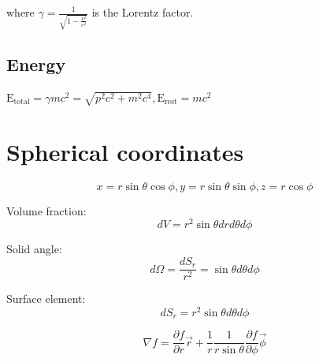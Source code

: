 \documentclass[12pt,a4paper]{article}
\begin{document}
	where \( \gamma = \frac{1}{\sqrt{1 - \frac{v^2}{c^2}}} \) is the Lorentz factor.
	
	\subsection*{Energy}
	$\text{E}_\text{total} = \gamma mc^2 = \sqrt{p^2c^2 + m^2c^4}, \text{E}_\text{rest} = mc^2$
	
		
	\section*{Spherical coordinates}
	\[
		x = r \sin \theta \cos \phi,  y = r \sin \theta \sin \phi, z = r \cos \phi
	\]

	
	\vspace{.1in}
	Volume fraction: 
	\[ dV = r^2 \sin \theta dr d\theta d\phi \]
	
	\vspace{.1in}
	Solid angle: 
	\[ d\Omega = \frac{dS_r}{r^2} = \sin\theta d\theta d\phi \]
	
	\vspace{.1in}
	Surface element: 
	\[ dS_r = r^2 \sin\theta d\theta d\phi \]
	
	
	\begin{equation}
		\nabla f = \frac{\partial f}{\partial r} \vec{r} + \frac{1}{r} \frac{1}{r \sin \theta} \frac{\partial f}{\partial \phi} \vec{\phi}
	\end{equation}
	
\end{document}
